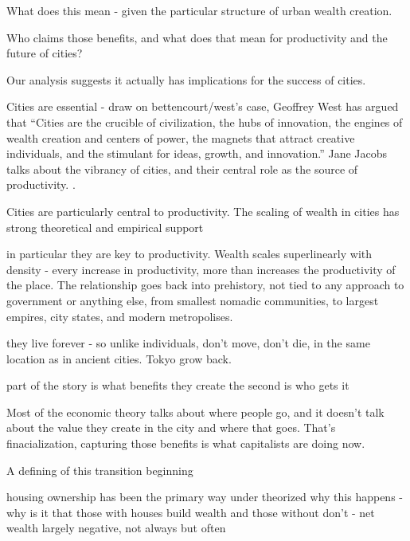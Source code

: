 What does this mean - given the particular structure of urban wealth creation.

Who claims those benefits, and what does that mean for productivity and the future of cities?

Our analysis suggests  it actually has  implications for the success of cities. %


Cities are essential - draw on bettencourt/west's case,
Geoffrey West has argued that ``Cities are the crucible of civilization, the hubs of innovation, the engines of wealth creation and centers of power, the magnets that attract creative individuals, and the stimulant for ideas, growth, and innovation.'' \cite{westScaleUniversalLaws2017} 
Jane Jacobs talks about the vibrancy of cities, and their central role as the source of productivity. 
 \cite{jacobsEconomyCities1969}.
 
 Cities are particularly central to productivity.
 The scaling of wealth in cities has strong theoretical and empirical support  \cite{bettencourtGrowthInnovationScaling2007, bettencourtOriginsScalingCities2013, dongUnderstandingMesoscopicScaling2020, loboUrbanScalingProduction2013} 


in particular they are key to productivity. Wealth scales superlinearly with density - every increase in productivity, more than increases the productivity of the place. 
The relationship goes back into prehistory, not tied to any approach to government or anything else, from smallest nomadic communities, to largest empires, city states, and modern metropolises.

they live forever - so unlike individuals, don't move, don't die, in the same location as in ancient cities. Tokyo grow back. 


part of the story is what benefits they create
the second is who gets it

Most of the economic theory talks about where people go, and it doesn't talk about the value they create in the city and where that goes. That's finacialization, capturing those benefits is what capitalists are doing now.



A defining of this transition
beginning 

housing ownership has been the primary way 
under theorized why this happens - why is it that those with houses build wealth and those without don't - net wealth largely negative, not always but often

